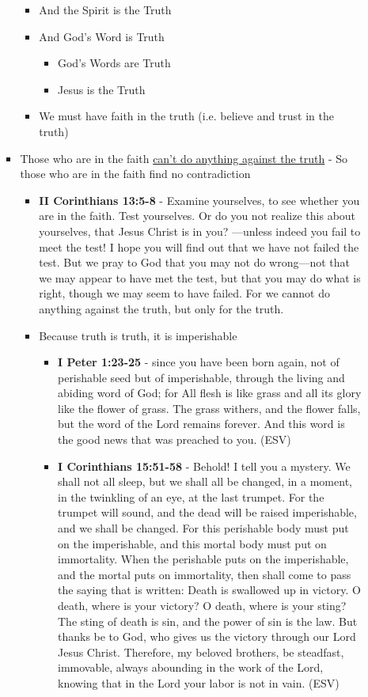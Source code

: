\documentclass[11pt]{article}
\begin{document}
\begin{itemize}
\begin{itemize}
\begin{itemize}
\begin{itemize}
\item And the Spirit is the Truth
\item And God's Word is Truth
\begin{itemize}
\item God's Words are Truth
\item Jesus is the Truth
\end{itemize}
\item We must have faith in the truth (i.e. believe and trust in the truth)
\end{itemize}
\item Those who are in the faith \uline{can't do anything against the truth} - So those who are in the faith find no contradiction
\begin{itemize}
\item \textbf{II Corinthians 13:5-8} - Examine yourselves, to see whether you are in the faith. Test yourselves. Or do you not realize this about yourselves, that Jesus Christ is in you? —unless indeed you fail to meet the test! I hope you will find out that we have not failed the test. But we pray to God that you may not do wrong—not that we may appear to have met the test, but that you may do what is right, though we may seem to have failed. For we cannot do anything against the truth, but only for the truth.
\item Because truth is truth, it is imperishable
\begin{itemize}
\item \textbf{I Peter 1:23-25} - since you have been born again, not of perishable seed but of imperishable, through the living and abiding word of God; for All flesh is like grass and all its glory like the flower of grass. The grass withers, and the flower falls, but the word of the Lord remains forever. And this word is the good news that was preached to you. (ESV)
\item \textbf{I Corinthians 15:51-58} - Behold! I tell you a mystery. We shall not all sleep, but we shall all be changed, in a moment, in the twinkling of an eye, at the last trumpet. For the trumpet will sound, and the dead will be raised imperishable, and we shall be changed. For this perishable body must put on the imperishable, and this mortal body must put on immortality. When the perishable puts on the imperishable, and the mortal puts on immortality, then shall come to pass the saying that is written: Death is swallowed up in victory. O death, where is your victory? O death, where is your sting? The sting of death is sin, and the power of sin is the law. But thanks be to God, who gives us the victory through our Lord Jesus Christ. Therefore, my beloved brothers, be steadfast, immovable, always abounding in the work of the Lord, knowing that in the Lord your labor is not in vain. (ESV)

\end{itemize}
\end{itemize}
\end{itemize}
\end{itemize}
\end{itemize}
\end{document}
